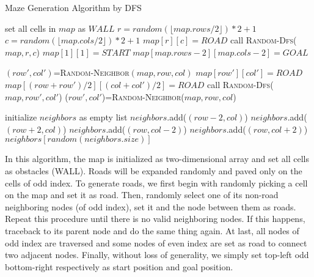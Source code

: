 \begin{algorithm}[ht!]
\caption{Maze Generation Algorithm by DFS}
\label{alg:maze-gen}
\begin{algorithmic}[1]
  \State set all cells in $map$ as $WALL$
  \State $r=random(\lfloor map.rows/2 \rfloor) * 2 + 1$
  \State $c=random(\lfloor map.cols/2 \rfloor) * 2 + 1$
  \State $map[r][c] = ROAD$
  \State call \textsc{Random-Dfs}($map, r, c$)
  \State $map[1][1] = START$
  \State $map[map.rows-2][map.cols-2] = GOAL$
\EndFunction
\end{algorithmic}
\begin{algorithmic}[1]
  \State $(row',col')$=\textsc{Random-Neighbor}$(map, row, col)$
    \State $map[row'][col']=ROAD$
    \State $map[(row+row')/2][(col+col')/2]=ROAD$
    \State call \textsc{Random-Dfs}($map, row', col'$)
    \State ($row',col'$)=\textsc{Random-Neighbor}($map, row, col$)
  \EndWhile
\EndFunction
\end{algorithmic}
\begin{algorithmic}[1]
  \State initialize $neighbors$ as empty list
    \State $neighbors$.add($(row-2, col)$)
  \EndIf
    \State $neighbors$.add($(row+2, col)$)
  \EndIf
    \State $neighbors$.add($(row, col-2)$)
  \EndIf
    \State $neighbors$.add($(row, col+2)$)
  \EndIf
  \Return $neighbors[random(neighbors.size)]$
\EndFunction
\end{algorithmic}
\end{algorithm}

In this algorithm, the map is initialized as two-dimensional array and set 
all cells as obstacles (WALL). Roads will be expanded randomly and paved only 
on the cells of odd index. To generate roads, we first begin with randomly 
picking a cell on the map and set it as road. Then, randomly select one of its 
non-road neighboring nodes (of odd index), set it and the node between them 
as roads. Repeat this procedure until there is no valid neighboring nodes. 
If this happens, traceback to its parent node and do the same thing again. At
last, all nodes of odd index are traversed and some nodes of even index are
set as road to connect two adjacent nodes. Finally, without loss of generality,
we simply set top-left odd bottom-right respectively as start position and goal
position.


